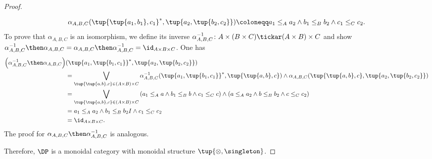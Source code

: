 \begin{proof}
\begin{itemize}
\begin{equation}
        \alpha_{A,B,C}(\tup{\tup{a_1,b_1},c_1}^*,\tup{a_2,\tup{b_2,c_2}})\coloneqq a_1\leq_Aa_2 \wedge b_1\leq_B b_2\wedge c_1\leq_C c_2.
    \end{equation}
    To prove that $\alpha_{A,B,C}$ is an isomorphism, we define its inverse $\alpha_{A,B,C}^{-1}\colon A\times (B\times C) \tickar (A\times B)\times C$ and show $\alpha_{A,B,C}^{-1}\then \alpha_{A,B,C}=\alpha_{A,B,C}\then \alpha_{A,B,C}^{-1}= \id_{A\times B\times C}$. One has
    \begin{equation}
        \begin{aligned}
           \left( \alpha_{A,B,C}^{-1}\then \alpha_{A,B,C} \right)&(\tup{a_1,\tup{b_1,c_1}}^*,\tup{a_2,\tup{b_2,c_2}})\\
           &=\bigvee_{\tup{\tup{a,b},c}\in (A\times B)\times C}
           \alpha_{A,B,C}^{-1}(\tup{a_1,\tup{b_1,c_1}}^*,\tup{\tup{a,b},c})\wedge \alpha_{A,B,C}(\tup{\tup{a,b},c},\tup{a_2,\tup{b_2,c_2}})\\
           &=\bigvee_{\tup{\tup{a,b},c}\in (A\times B)\times C}\left( a_1\leq_A a \wedge b_1\leq_B b \wedge c_1\leq_C c\right)\wedge \left(a\leq_A a_2\wedge b\leq_B b_2 \wedge c\leq_C c_2\right)\\
           &=a_1\leq_Aa_2\wedge b_1\leq_B b_2 I \wedge c_1\leq_C c_2\\
           &=\id_{A\times B\times C}.
        \end{aligned}
    \end{equation}
    The proof for $\alpha_{A,B,C}\then \alpha_{A,B,C}^{-1}$ is analogous.
\end{itemize}
Therefore, $\DP$ is a monoidal category with monoidal structure $\tup{\otimes, \singleton}$.
\end{proof}